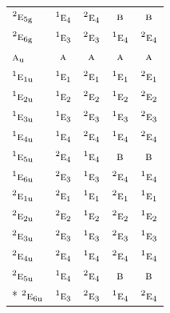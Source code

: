 \documentclass[10pt,a4paper]{article}
\numberwithin{equation}{section}
\newcommand{\irr}[1]{\text{\normalfont\scshape #1}}
\newcommand{\conjpair}[1]{{}^{#1}}
\newcommand{\ptag}[1]{\mathrm{#1}}
\begin{document}
{\begin{longtable}{@{}lcccc@{}}
$\conjpair{2}\irr{e}_{5\ptag{g}}$ & $\conjpair{1}\irr{e}_{4}$ & $\conjpair{2}\irr{e}_{4}$ & $\irr{b}$ & $\irr{b}$\\
$\conjpair{2}\irr{e}_{6\ptag{g}}$ & $\conjpair{1}\irr{e}_{3}$ & $\conjpair{2}\irr{e}_{3}$ & $\conjpair{1}\irr{e}_{4}$ & $\conjpair{2}\irr{e}_{4}$\\
$\irr{a}_{\ptag{u}}$ & $\irr{a}$ & $\irr{a}$ & $\irr{a}$ & $\irr{a}$\\
$\conjpair{1}\irr{e}_{1\ptag{u}}$ & $\conjpair{1}\irr{e}_{1}$ & $\conjpair{2}\irr{e}_{1}$ & $\conjpair{1}\irr{e}_{1}$ & $\conjpair{2}\irr{e}_{1}$\\
$\conjpair{1}\irr{e}_{2\ptag{u}}$ & $\conjpair{1}\irr{e}_{2}$ & $\conjpair{2}\irr{e}_{2}$ & $\conjpair{1}\irr{e}_{2}$ & $\conjpair{2}\irr{e}_{2}$\\
$\conjpair{1}\irr{e}_{3\ptag{u}}$ & $\conjpair{1}\irr{e}_{3}$ & $\conjpair{2}\irr{e}_{3}$ & $\conjpair{1}\irr{e}_{3}$ & $\conjpair{2}\irr{e}_{3}$\\
$\conjpair{1}\irr{e}_{4\ptag{u}}$ & $\conjpair{1}\irr{e}_{4}$ & $\conjpair{2}\irr{e}_{4}$ & $\conjpair{1}\irr{e}_{4}$ & $\conjpair{2}\irr{e}_{4}$\\
$\conjpair{1}\irr{e}_{5\ptag{u}}$ & $\conjpair{2}\irr{e}_{4}$ & $\conjpair{1}\irr{e}_{4}$ & $\irr{b}$ & $\irr{b}$\\
$\conjpair{1}\irr{e}_{6\ptag{u}}$ & $\conjpair{2}\irr{e}_{3}$ & $\conjpair{1}\irr{e}_{3}$ & $\conjpair{2}\irr{e}_{4}$ & $\conjpair{1}\irr{e}_{4}$\\
$\conjpair{2}\irr{e}_{1\ptag{u}}$ & $\conjpair{2}\irr{e}_{1}$ & $\conjpair{1}\irr{e}_{1}$ & $\conjpair{2}\irr{e}_{1}$ & $\conjpair{1}\irr{e}_{1}$\\
$\conjpair{2}\irr{e}_{2\ptag{u}}$ & $\conjpair{2}\irr{e}_{2}$ & $\conjpair{1}\irr{e}_{2}$ & $\conjpair{2}\irr{e}_{2}$ & $\conjpair{1}\irr{e}_{2}$\\
$\conjpair{2}\irr{e}_{3\ptag{u}}$ & $\conjpair{2}\irr{e}_{3}$ & $\conjpair{1}\irr{e}_{3}$ & $\conjpair{2}\irr{e}_{3}$ & $\conjpair{1}\irr{e}_{3}$\\
$\conjpair{2}\irr{e}_{4\ptag{u}}$ & $\conjpair{2}\irr{e}_{4}$ & $\conjpair{1}\irr{e}_{4}$ & $\conjpair{2}\irr{e}_{4}$ & $\conjpair{1}\irr{e}_{4}$\\
$\conjpair{2}\irr{e}_{5\ptag{u}}$ & $\conjpair{1}\irr{e}_{4}$ & $\conjpair{2}\irr{e}_{4}$ & $\irr{b}$ & $\irr{b}$\\*
$\conjpair{2}\irr{e}_{6\ptag{u}}$ & $\conjpair{1}\irr{e}_{3}$ & $\conjpair{2}\irr{e}_{3}$ & $\conjpair{1}\irr{e}_{4}$ & $\conjpair{2}\irr{e}_{4}$\\
\bottomrule\end{longtable}}
\end{document}
